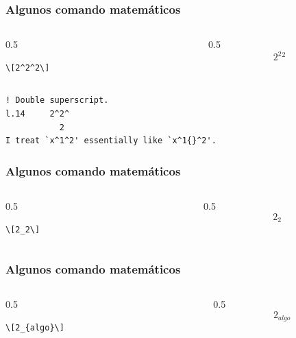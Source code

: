 \documentclass[12pt,aspectratio=169,ignorenonframetext]{ltxbeamer}
\begin{document}
\begin{frame}[fragile]
\frametitle{Algunos comando matemáticos}

\begin{columns}
    \begin{column}{0.5\textwidth}
        \begin{verbatim}
\[2^2^2\]
        \end{verbatim}
    \end{column}
    {\color{gray} \vline}
    \begin{column}{0.5\textwidth}
        \[2^2{}^2\]
    \end{column}
\end{columns}

\pause

\begin{verbatim}
! Double superscript.
l.14     2^2^
           2
I treat `x^1^2' essentially like `x^1{}^2'.
\end{verbatim}
\end{frame}





\begin{frame}[fragile]
\frametitle{Algunos comando matemáticos}

\begin{columns}
    \begin{column}{0.5\textwidth}
        \begin{verbatim}
\[2_2\]
        \end{verbatim}
    \end{column}
    {\color{gray} \vline}
    \begin{column}{0.5\textwidth}
        \[2_2\]
    \end{column}
\end{columns}
\end{frame}





\begin{frame}[fragile]
\frametitle{Algunos comando matemáticos}

\begin{columns}
    \begin{column}{0.5\textwidth}
        \begin{verbatim}
\[2_{algo}\]
        \end{verbatim}
    \end{column}
    {\color{gray} \vline}
    \begin{column}{0.5\textwidth}
        \[2_{algo}\]
    \end{column}
\end{columns}
\end{frame}
\end{document}
